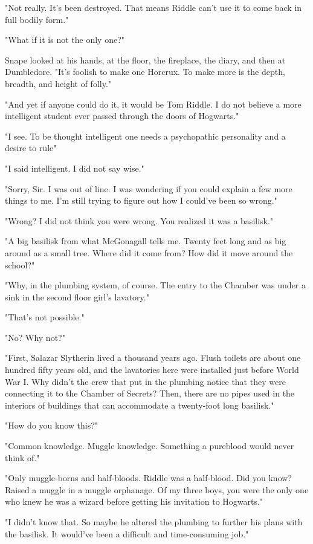 "Not really. It's been destroyed. That means Riddle can't use it to come back in full bodily form."

"What if it is not the only one?"

Snape looked at his hands, at the floor, the fireplace, the diary, and then at Dumbledore. "It's foolish to make one Horcrux. To make more is the depth, breadth, and height of folly."

"And yet if anyone could do it, it would be Tom Riddle. I do not believe a more intelligent student ever passed through the doors of Hogwarts."

"I see. To be thought intelligent one needs a psychopathic personality and a desire to rule{\el}"

"I said intelligent. I did not say wise."

"Sorry, Sir. I was out of line. I was wondering if you could explain a few more things to me. I'm still trying to figure out how I could've been so wrong."

"Wrong? I did not think you were wrong. You realized it was a basilisk."

"A big basilisk from what McGonagall tells me. Twenty feet long and as big around as a small tree. Where did it come from? How did it move around the school?"

"Why, in the plumbing system, of course. The entry to the Chamber was under a sink in the second floor girl's lavatory."

"That's not possible."

"No? Why not?"

"First, Salazar Slytherin lived a thousand years ago. Flush toilets are about one hundred fifty years old, and the lavatories here were installed just before World War I. Why didn't the crew that put in the plumbing notice that they were connecting it to the Chamber of Secrets? Then, there are no pipes used in the interiors of buildings that can accommodate a twenty-foot long basilisk."

"How do you know this?"

"Common knowledge. Muggle knowledge. Something a pureblood would never think of."

"Only muggle-borns and half-bloods. Riddle was a half-blood. Did you know? Raised a muggle in a muggle orphanage. Of my three boys, you were the only one who knew he was a wizard before getting his invitation to Hogwarts."

"I didn't know that. So maybe he altered the plumbing to further his plans with the basilisk. It would've been a difficult and time-consuming job."

